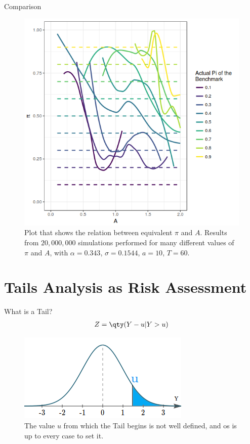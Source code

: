 \documentclass[10pt]{beamer}
\begin{document}
\begin{frame}[fragile]{Comparison}
  \begin{figure}[h]
    \centering
    \includegraphics[scale=0.35]{pi-a_mort2.png}
    \caption{Plot that shows the relation between equivalent $\pi$ and $A$. Results from $20,000,000$ simulations performed for many different values of $\pi$ and $A$, with $\alpha = 0.343$, $\sigma = 0.1544$, $a = 10$, $T = 60$.}
    \label{fig:es}
  \end{figure}
\end{frame}

\section{Tails Analysis as Risk Assessment}

\begin{frame}[fragile]{What is a Tail?}
  \begin{align*}
    Z = \qty(Y-u | Y>u)
  \end{align*}
    \begin{figure}[h]
    \centering
    \includegraphics[scale=0.65]{tail.png}
    \caption{The value $u$ from which the Tail begins is not well defined, and os is up to every case to set it.}
    \label{fig:var}
  \end{figure}
\end{frame}
\end{document}
